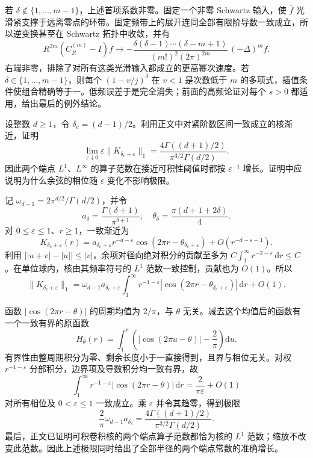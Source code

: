 \begin{solution}
若 \(\delta\notin\{1,\ldots,m-1\}\)，上述首项系数非零。固定一个非零 Schwartz 输入，使 \(\widehat f\) 光滑紧支撑于远离零点的环带。固定频带上的展开连同全部有限阶导数一致成立，所以逆变换甚至在 Schwartz 拓扑中收敛，并有
\[
 R^{2m}(C_R^{(m)}-I)f\longrightarrow
 -\frac{\delta(\delta-1)\cdots(\delta-m+1)}
          {(m!)^2(2\pi)^{2m}}\,(-\Delta)^mf.
\]
右端非零，排除了对所有这类光滑输入都成立的更高幂次速度。若 \(\delta\in\{1,\ldots,m-1\}\)，则每个 \((1-v/j)^\delta\) 在 \(v<1\) 是次数低于 \(m\) 的多项式，插值条件使组合精确等于一。低频误差于是完全消失；前面的高频论证对每个 \(s>0\) 都适用，给出最后的例外结论。
\end{solution}

\begin{exercise}\label{b2:ex:24-new-6}
设整数 \(d\geq1\)，令 \(\delta_c=(d-1)/2\)。利用正文中对紧阶数区间一致成立的核渐近，证明
\[
 \lim_{\varepsilon\downarrow0}
      \varepsilon\|K_{\delta_c+\varepsilon}\|_1
 =\frac{4\Gamma((d+1)/2)}{\pi^{3/2}\Gamma(d/2)}.
\]
因此两个端点 \(L^1\)、\(L^\infty\) 的算子范数在接近可积性阈值时都按 \(\varepsilon^{-1}\) 增长。证明中应说明为什么余弦的相位随 \(\varepsilon\) 变化不影响极限。
\end{exercise}
\begin{solution}
记 \(\omega_{d-1}=2\pi^{d/2}/\Gamma(d/2)\)，并令
\[
 a_\delta=\frac{\Gamma(\delta+1)}{\pi^{\delta+1}},
 \quad \theta_\delta=\frac{\pi(d+1+2\delta)}4.
\]
对 \(0\leq\varepsilon\leq1\)、\(r\geq1\)，一致渐近为
\[
 K_{\delta_c+\varepsilon}(r)
 =a_{\delta_c+\varepsilon}r^{-d-\varepsilon}
       \cos(2\pi r-\theta_{\delta_c+\varepsilon})
       +O(r^{-d-\varepsilon-1}).
\]
利用 \(\bigl||u+v|-|u|\bigr|\leq|v|\)，余项对径向绝对积分的贡献至多为
\(C\int_1^\infty r^{-2-\varepsilon}\,\mathrm dr\leq C\)。在单位球内，核由其频率符号的 \(L^1\) 范数一致控制，贡献也为 \(O(1)\)。所以
\[
 \|K_{\delta_c+\varepsilon}\|_1
 =\omega_{d-1}a_{\delta_c+\varepsilon}
   \int_1^\infty r^{-1-\varepsilon}
          |\cos(2\pi r-\theta_{\delta_c+\varepsilon})|\,\mathrm dr+O(1).
\]

函数 \(|\cos(2\pi r-\theta)|\) 的周期均值为 \(2/\pi\)，与 \(\theta\) 无关。减去这个均值后的函数有一个一致有界的原函数
\[
 H_\theta(r)=\int_1^r
       \left(|\cos(2\pi u-\theta)|-\frac2\pi\right)\mathrm du.
\]
有界性由整周期积分为零、剩余长度小于一直接得到，且界与相位无关。对权 \(r^{-1-\varepsilon}\) 分部积分，边界项及导数积分均一致有界，故
\[
 \int_1^\infty r^{-1-\varepsilon}|\cos(2\pi r-\theta)|\,\mathrm dr
 =\frac2{\pi\varepsilon}+O(1)
\]
对所有相位及 \(0<\varepsilon\leq1\) 一致成立。乘 \(\varepsilon\) 并令其趋零，得到极限
\[
 \frac2\pi\omega_{d-1}a_{\delta_c}
 =\frac{4\Gamma((d+1)/2)}{\pi^{3/2}\Gamma(d/2)}.
\]
最后，正文已证明可积卷积核的两个端点算子范数都恰为核的 \(L^1\) 范数；缩放不改变此范数。因此上述极限同时给出了全部半径的两个端点常数的准确增长。
\end{solution}

